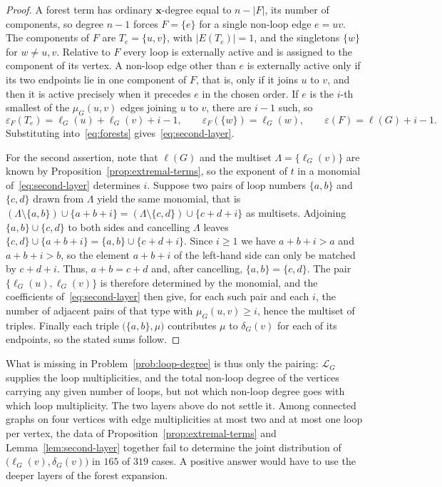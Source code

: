 \documentclass[11pt]{article}
\theoremstyle{plain}
\theoremstyle{definition}
\renewcommand{\mathcal}{\mathscr}
\newcommand{\LL}{\mathcal{L}}    %
\newcommand{\bx}{\mathbf{x}}
\newcommand{\eps}{\varepsilon}
\numberwithin{equation}{section}
\begin{document}
\begin{proof}
  A forest term has ordinary $\bx$-degree equal to
  $n-|F|$,
  its number of components, so degree $n-1$ forces $F=\{e\}$ for a single non-loop edge
$e=uv$.  The components of $F$ are $T_e=\{u,v\}$, with
$|E(T_e)|=1$, and the singletons $\{w\}$ for $w\ne u,v$.  Relative to $F$
every loop is externally active and is assigned to the component of its
vertex. A non-loop edge other than $e$ is externally active only if its two
endpoints lie in one component of $F$, that is, only if it joins $u$ to $v$,
and then it is active precisely when it precedes $e$ in the chosen order.
If $e$ is the $i$-th smallest of the $\mu_G(u,v)$ edges joining $u$ to $v$,
there are $i-1$ such, so
\[
   \eps_F(T_e)=\ell_G(u)+\ell_G(v)+i-1,
   \qquad
   \eps_F(\{w\})=\ell_G(w),
   \qquad
   \eps(F)=\ell(G)+i-1 .
\]
Substituting into~\eqref{eq:forests} gives~\eqref{eq:second-layer}.

For the second assertion, note that $\ell(G)$ and the multiset
$\Lambda=\{\ell_G(v)\}$ are known by Proposition~\ref{prop:extremal-terms},
so the exponent of $t$ in a monomial of~\eqref{eq:second-layer} determines
$i$.  Suppose two pairs of loop numbers $\{a,b\}$ and $\{c,d\}$ drawn from
$\Lambda$ yield the same monomial, that is
$(\Lambda\setminus\{a,b\})\cup\{a+b+i\}
 =(\Lambda\setminus\{c,d\})\cup\{c+d+i\}$
as multisets.  Adjoining $\{a,b\}\cup\{c,d\}$ to both sides and cancelling
$\Lambda$ leaves
$\{c,d\}\cup\{a+b+i\}=\{a,b\}\cup\{c+d+i\}$.
Since $i\ge 1$ we have $a+b+i>a$ and $a+b+i>b$, so the element $a+b+i$ of the
left-hand side can only be matched by $c+d+i$. Thus, $a+b=c+d$ and, after
cancelling, $\{a,b\}=\{c,d\}$.  The pair $\{\ell_G(u),\ell_G(v)\}$ is
therefore determined by the monomial, and the coefficients
of~\eqref{eq:second-layer} then give, for each such pair and each $i$, the
number of adjacent pairs of that type with $\mu_G(u,v)\ge i$, hence the
multiset of triples.  Finally each triple
$\bigl(\{a,b\},\mu\bigr)$ contributes $\mu$ to $\delta_G(v)$ for each of its
endpoints, so the stated sums follow.
\end{proof}

What is missing in Problem~\ref{prob:loop-degree} is thus only the pairing:
$\LL_G$ supplies the loop multiplicities, and the total non-loop degree of the vertices carrying any given number of loops, but not which non-loop
degree goes with which loop multiplicity.  The two layers above do not settle it.
Among connected graphs on four vertices with edge multiplicities at most two and at most one loop per vertex, the data of
Proposition~\ref{prop:extremal-terms} and Lemma~\ref{lem:second-layer}
together fail to determine the joint distribution of
$\bigl(\ell_G(v),\delta_G(v)\bigr)$ in $165$ of $319$ cases. A positive answer would have to use the deeper layers of the forest expansion.
\end{document}
